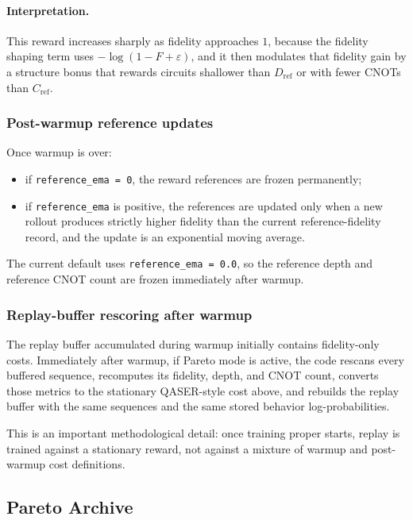 \documentclass[11pt]{article}
\begin{document}
\paragraph{Interpretation.}
This reward increases sharply as fidelity approaches $1$, because the fidelity shaping term uses $-\log(1-F+\varepsilon)$, and it then modulates that fidelity gain by a structure bonus that rewards circuits shallower than $D_{\mathrm{ref}}$ or with fewer CNOTs than $C_{\mathrm{ref}}$.

\subsubsection{Post-warmup reference updates}

Once warmup is over:
\begin{itemize}[leftmargin=*]
\item if \texttt{reference\_ema = 0}, the reward references are frozen permanently;
\item if \texttt{reference\_ema} is positive, the references are updated only when a new rollout produces strictly higher fidelity than the current reference-fidelity record, and the update is an exponential moving average.
\end{itemize}

The current default uses \texttt{reference\_ema = 0.0}, so the reference depth and reference CNOT count are frozen immediately after warmup.

\subsubsection{Replay-buffer rescoring after warmup}

The replay buffer accumulated during warmup initially contains fidelity-only costs.
Immediately after warmup, if Pareto mode is active, the code rescans every buffered sequence, recomputes its fidelity, depth, and CNOT count, converts those metrics to the stationary QASER-style cost above, and rebuilds the replay buffer with the same sequences and the same stored behavior log-probabilities.

This is an important methodological detail: once training proper starts, replay is trained against a stationary reward, not against a mixture of warmup and post-warmup cost definitions.

\subsection{Pareto Archive}
\end{document}
